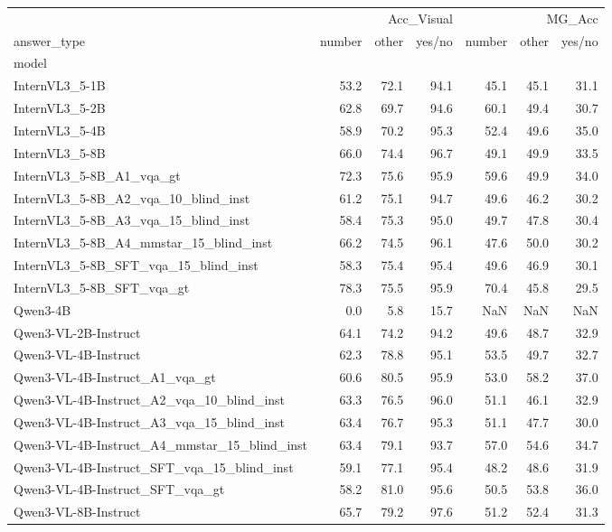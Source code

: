 \begin{tabular}{lrrrrrr}
\toprule
 & \multicolumn{3}{r}{Acc_Visual} & \multicolumn{3}{r}{MG_Acc} \\
answer_type & number & other & yes/no & number & other & yes/no \\
model &  &  &  &  &  &  \\
\midrule
InternVL3_5-1B & 53.2 & 72.1 & 94.1 & 45.1 & 45.1 & 31.1 \\
InternVL3_5-2B & 62.8 & 69.7 & 94.6 & 60.1 & 49.4 & 30.7 \\
InternVL3_5-4B & 58.9 & 70.2 & 95.3 & 52.4 & 49.6 & 35.0 \\
InternVL3_5-8B & 66.0 & 74.4 & 96.7 & 49.1 & 49.9 & 33.5 \\
InternVL3_5-8B_A1_vqa_gt & 72.3 & 75.6 & 95.9 & 59.6 & 49.9 & 34.0 \\
InternVL3_5-8B_A2_vqa_10_blind_inst & 61.2 & 75.1 & 94.7 & 49.6 & 46.2 & 30.2 \\
InternVL3_5-8B_A3_vqa_15_blind_inst & 58.4 & 75.3 & 95.0 & 49.7 & 47.8 & 30.4 \\
InternVL3_5-8B_A4_mmstar_15_blind_inst & 66.2 & 74.5 & 96.1 & 47.6 & 50.0 & 30.2 \\
InternVL3_5-8B_SFT_vqa_15_blind_inst & 58.3 & 75.4 & 95.4 & 49.6 & 46.9 & 30.1 \\
InternVL3_5-8B_SFT_vqa_gt & 78.3 & 75.5 & 95.9 & 70.4 & 45.8 & 29.5 \\
Qwen3-4B & 0.0 & 5.8 & 15.7 & NaN & NaN & NaN \\
Qwen3-VL-2B-Instruct & 64.1 & 74.2 & 94.2 & 49.6 & 48.7 & 32.9 \\
Qwen3-VL-4B-Instruct & 62.3 & 78.8 & 95.1 & 53.5 & 49.7 & 32.7 \\
Qwen3-VL-4B-Instruct_A1_vqa_gt & 60.6 & 80.5 & 95.9 & 53.0 & 58.2 & 37.0 \\
Qwen3-VL-4B-Instruct_A2_vqa_10_blind_inst & 63.3 & 76.5 & 96.0 & 51.1 & 46.1 & 32.9 \\
Qwen3-VL-4B-Instruct_A3_vqa_15_blind_inst & 63.4 & 76.7 & 95.3 & 51.1 & 47.7 & 30.0 \\
Qwen3-VL-4B-Instruct_A4_mmstar_15_blind_inst & 63.4 & 79.1 & 93.7 & 57.0 & 54.6 & 34.7 \\
Qwen3-VL-4B-Instruct_SFT_vqa_15_blind_inst & 59.1 & 77.1 & 95.4 & 48.2 & 48.6 & 31.9 \\
Qwen3-VL-4B-Instruct_SFT_vqa_gt & 58.2 & 81.0 & 95.6 & 50.5 & 53.8 & 36.0 \\
Qwen3-VL-8B-Instruct & 65.7 & 79.2 & 97.6 & 51.2 & 52.4 & 31.3 \\

\end{tabular}
